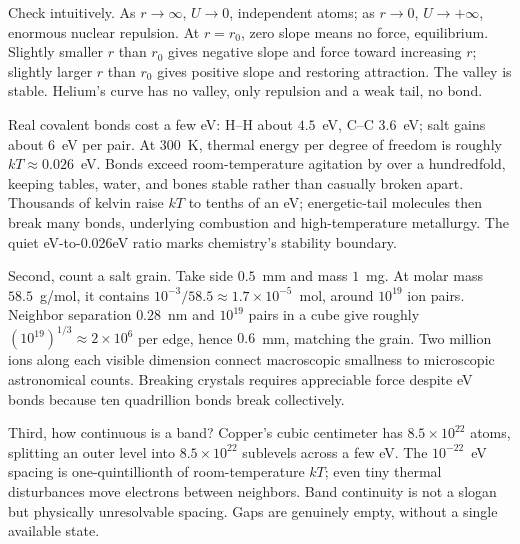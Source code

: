 Check intuitively. As \(r\to\infty\), \(U\to 0\), independent atoms; as \(r\to 0\), \(U\to+\infty\), enormous nuclear repulsion. At \(r=r_0\), zero slope means no force, equilibrium. Slightly smaller \(r\) than \(r_0\) gives negative slope and force toward increasing \(r\); slightly larger \(r\) than \(r_0\) gives positive slope and restoring attraction. The valley is stable. Helium's curve has no valley, only repulsion and a weak tail, no bond.

Real covalent bonds cost a few eV: H--H about \(4.5\)~eV, C--C \(3.6\)~eV; salt gains about \(6\)~eV per pair. At \(300\)~K, thermal energy per degree of freedom is roughly \(kT\approx0.026\)~eV. Bonds exceed room-temperature agitation by over a hundredfold, keeping tables, water, and bones stable rather than casually broken apart. Thousands of kelvin raise \(kT\) to tenths of an eV; energetic-tail molecules then break many bonds, underlying combustion and high-temperature metallurgy. The quiet eV-to-0.026eV ratio marks chemistry's stability boundary.

Second, count a salt grain. Take side \(0.5\)~mm and mass \(1\)~mg. At molar mass \(58.5\)~g/mol, it contains \(10^{-3}/58.5\approx1.7\times10^{-5}\)~mol, around \(10^{19}\) ion pairs. Neighbor separation \(0.28\)~nm and \(10^{19}\) pairs in a cube give roughly \((10^{19})^{1/3}\approx2\times10^{6}\) per edge, hence \(0.6\)~mm, matching the grain. Two million ions along each visible dimension connect macroscopic smallness to microscopic astronomical counts. Breaking crystals requires appreciable force despite eV bonds because ten quadrillion bonds break collectively.

Third, how continuous is a band? Copper's cubic centimeter has \(8.5\times10^{22}\) atoms, splitting an outer level into \(8.5\times10^{22}\) sublevels across a few eV. The \(10^{-22}\)~eV spacing is one-quintillionth of room-temperature \(kT\); even tiny thermal disturbances move electrons between neighbors. Band continuity is not a slogan but physically unresolvable spacing. Gaps are genuinely empty, without a single available state.

\begin{figure}[htbp]
\centering
{}
\end{figure}


